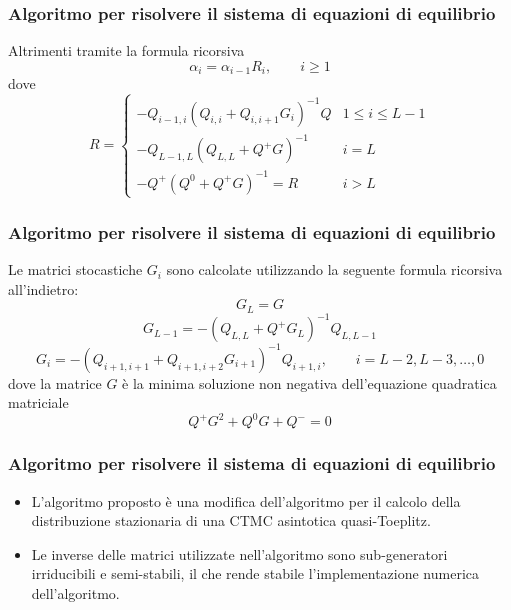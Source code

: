 \documentclass{beamer}
\begin{document}
\begin{frame}
    \frametitle{Algoritmo per risolvere il sistema di equazioni di equilibrio}
    \begin{theorem}
        Altrimenti tramite la formula ricorsiva
        \begin{equation*}\label{eq:rec-alpha}
            \alpha_i = \alpha_{i-1} R_i, \qquad i \geq 1
        \end{equation*}
        dove
        \begin{equation*}
            R =
            \begin{cases}
                -Q_{i-1,i}(Q_{i,i} + Q_{i,i+1}G_i)^{-1}Q & 1 \leq i \leq L-1 \\
                -Q_{L-1,L}(Q_{L,L} + Q^+G)^{-1} & i = L \\
                -Q^+(Q^0 + Q^+G)^{-1} = R & i>L
            \end{cases}
        \end{equation*}
    \end{theorem}
\end{frame}


\begin{frame}
    \frametitle{Algoritmo per risolvere il sistema di equazioni di equilibrio}
    \begin{theorem}
        Le matrici stocastiche $G_i$ sono calcolate utilizzando la seguente formula ricorsiva all'indietro:
            $$G_L = G$$
            $$G_{L-1} = -(Q_{L,L} + Q^+G_L)^{-1}Q_{L,L-1}$$
            $$G_i = -(Q_{i+1,i+1} + Q_{i+1,i+2}G_{i+1})^{-1}Q_{i+1,i}, \qquad i = L-2, L-3, \dots, 0$$
        dove la matrice $G$ è la minima soluzione non negativa dell'equazione quadratica matriciale
        \begin{equation*}
            Q^+G^2 + Q^0G + Q^- = 0
        \end{equation*}
    \end{theorem}
\end{frame}


\begin{frame}
    \frametitle{Algoritmo per risolvere il sistema di equazioni di equilibrio}
    \begin{itemize}
        \item L'algoritmo proposto è una modifica dell'algoritmo per il calcolo della distribuzione stazionaria di una CTMC asintotica quasi-Toeplitz.
        \item Le inverse delle matrici utilizzate nell'algoritmo sono sub-generatori irriducibili e semi-stabili, il che rende stabile l'implementazione numerica dell'algoritmo.
    \end{itemize}
\end{frame}
\end{document}
